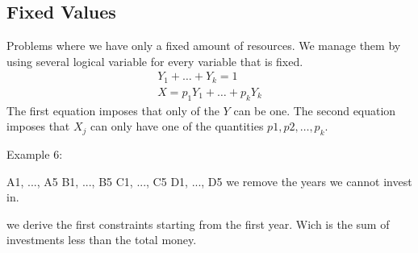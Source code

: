 \documentclass[12pt]{article}
\begin{document}
\subsection{Fixed Values}
Problems where we have only a fixed amount of resources. We manage them by using several logical variable for every variable that is fixed.
\begin{align*}
  Y_1 + \dots + Y_k = 1 \\
  X = p_1 Y_1 + \dots + p_k Y_k
\end{align*}
The first equation imposes that only of the $Y$ can be one. The second equation imposes that $X_j$ can only have one of the quantities $p1, p2, \dots, p_k$.


Example 6:


A1, ..., A5
B1, ..., B5
C1, ..., C5
D1, ..., D5
we remove the years we cannot invest in.

we derive the first constraints starting from the first year. Wich is the sum of investments less than the total money.
\end{document}
